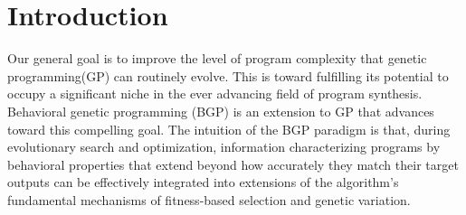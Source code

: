 \newcommand{\st}{subprogram\xspace} 

\section{Introduction}\label{sect:intro}
Our general goal is to improve the level of program complexity that genetic programming(GP) can routinely evolve\cite{Koza}. This is toward fulfilling its potential to occupy a significant niche in the ever advancing field of program synthesis.  Behavioral genetic programming (BGP) is an extension to GP that advances toward this compelling goal\cite{KrawiecGECCO2014,KrawiecBPS2016}. The intuition of the BGP paradigm is that, during evolutionary search and optimization, information characterizing programs by behavioral properties that extend beyond how accurately they match their target outputs can be effectively integrated into extensions of the algorithm's fundamental mechanisms of fitness-based selection and genetic variation. 

